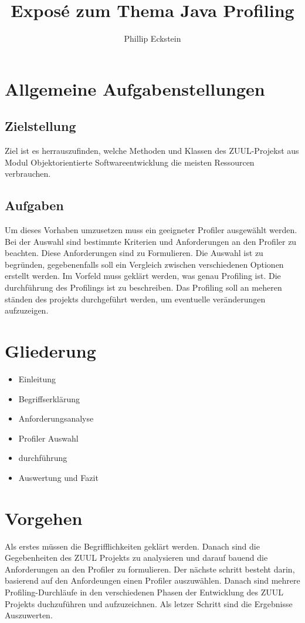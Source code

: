 \documentclass{article}
\author{Phillip Eckstein}
\title{Exposé zum Thema Java Profiling}
\begin{document}
    \maketitle
    \tableofcontents

    \pagebreak

    \section{Allgemeine Aufgabenstellungen}
    \subsection{Zielstellung}
    Ziel ist es herrauszufinden, welche Methoden und Klassen des ZUUL-Projekst aus Modul Objektorientierte Softwareentwicklung die meisten Ressourcen verbrauchen.

    \subsection{Aufgaben}
    Um dieses Vorhaben umzusetzen muss ein geeigneter Profiler ausgewählt werden. Bei der Auswahl sind bestimmte Kriterien und Anforderungen an den Profiler zu beachten. Diese Anforderungen sind zu Formulieren. Die Auswahl ist zu begründen, gegebenenfalls soll ein Vergleich zwischen verschiedenen Optionen erstellt werden. Im Vorfeld muss geklärt werden, was genau Profiling ist. Die durchführung des Profilings ist zu beschreiben. Das Profiling soll an meheren ständen des projekts durchgeführt werden, um eventuelle veränderungen aufzuzeigen.

    \section{Gliederung}
    \begin{itemize}
      \item Einleitung
      \item Begriffserklärung
      \item Anforderungsanalyse
      \item Profiler Auswahl
      \item durchführung
      \item Auswertung und Fazit
    \end{itemize}

    \section{Vorgehen}
    Als erstes müssen die Begrifflichkeiten geklärt werden. Danach sind die Gegebenheiten des ZUUL Projekts zu analysieren und darauf bauend die Anforderungen an den Profiler zu formulieren. Der nächste schritt besteht darin, basierend auf den Anfordeungen einen Profiler auszuwählen. Danach sind mehrere Profiling-Durchläufe in den verschiedenen Phasen der Entwicklung des ZUUL Projekts duchzuführen und aufzuzeichnen. Als letzer Schritt sind die Ergebnisse Auszuwerten.
    
\end{document}

